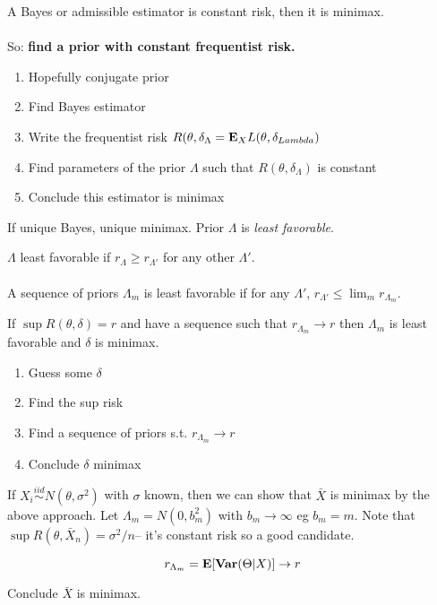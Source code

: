 \documentclass{article}
\newcommand{\simiid}{\overset{iid}\sim }
\begin{document}
\begin{recipe}
	A Bayes or admissible estimator is constant risk, then it is minimax. \\\\
	
	So: \textbf{find a prior with constant frequentist risk. }
	\begin{enumerate}
		\item Hopefully conjugate prior
		\item Find Bayes estimator 
		\item Write the frequentist risk $R(\theta,\delta_{\Lambda} = \mathbf{E}_X L(\theta, \delta_{Lambda})$
		\item Find parameters of the prior $\Lambda$ such that $R(\theta,\delta_\Lambda)$ is constant
		\item Conclude this estimator is minimax
	\end{enumerate}
	If unique Bayes, unique minimax. Prior $\Lambda$ is \textit{least favorable}.
\end{recipe}

\begin{definition}
$\Lambda$ least favorable if $r_\Lambda \geq r_{\Lambda'}$ for any other $\Lambda'$. \\\\
A sequence of priors $\Lambda_m$ is least favorable if for any $\Lambda'$, $r_{\Lambda'} \leq \lim_m r_{\Lambda_m}$.
\end{definition}

\begin{recipe}
If $\sup R(\theta,\delta) = r$ and have a sequence such that $r_{\Lambda_m} \to r$ then $\Lambda_m$ is least favorable and $\delta$ is minimax. 
\begin{enumerate}
	\item Guess some $\delta$ 
	\item Find the sup risk 
	\item Find a sequence of priors s.t. $r_{\Lambda_m} \to r$ 
	\item Conclude $\delta$ minimax
\end{enumerate}
\end{recipe}
\begin{example}
If $X_i \simiid N(\theta,\sigma^2)$ with $\sigma$ known, then we can show that $\bar X$ is minimax by the above approach. Let $\Lambda_m = N(0,b_m^2)$ with $b_m \to \infty$ eg $b_m = m$. Note that $\sup R(\theta, \bar X_n) = \sigma^2/n$-- it's constant risk so a good candidate. 

$$r_{\Lambda_m} = \mathbf{E} [\mathbf{Var} (\Theta|X)] \to r$$

Conclude $\bar X$ is minimax.
\end{example}
\end{document}
